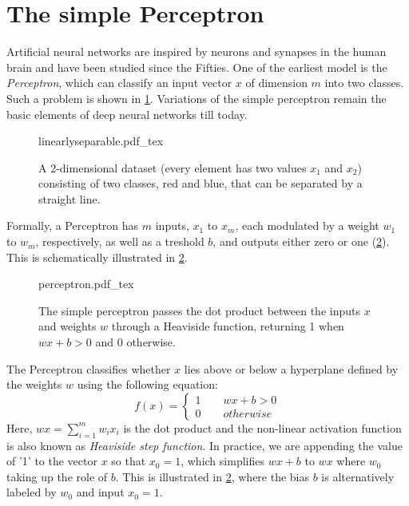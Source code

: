 \section{The simple Perceptron}
Artificial neural networks are inspired by neurons and synapses in the human brain and have been studied since the Fifties. One of the earliest model is the \textsl{Perceptron}, which can classify an input vector $x$ of dimension $m$ into two classes. Such a problem is shown in \cref{fig:linearsep}. Variations of the simple perceptron remain the basic elements of deep neural networks till today.

\begin{figure}[htb]
    \centering
    \def\svgwidth{0.6\textwidth}
    {linearlyseparable.pdf_tex}
    \caption{A 2-dimensional dataset (every element has two values $x_1$ and $x_2$) consisting of two classes, red and blue, that can be separated by a straight line.\label{fig:linearsep}}
\end{figure}

Formally, a Perceptron has $m$ inputs, $x_1$ to $x_m$, each modulated by a weight $w_1$ to $w_m$, respectively, as well as a treshold $b$, and outputs either zero or one (\cref{fig:perceptron}). This is schematically illustrated in \cref{fig:perceptron}.

\begin{figure}[htb]
    \centering
    \def\svgwidth{0.66\textwidth}
    {perceptron.pdf_tex}
    \caption{The simple perceptron passes the dot product between the inputs $x$ and weights $w$ through a Heaviside function, returning 1 when $wx+b>0$ and 0 otherwise.
    }\label{fig:perceptron}
\end{figure}

The Perceptron classifies whether $x$ lies above or below a hyperplane defined by the weights $w$ using the following equation:
%
\begin{equation}
f(x)=\begin{cases}
1 \qquad wx+b > 0\\
0 \qquad otherwise
\end{cases}
\end{equation}
%
Here, $wx=\sum_{i=1}^mw_ix_i$ is the dot product and the non-linear activation function is also known as \textsl{Heaviside step function}. In practice, we are appending the value of '1' to the vector $x$ so that $x_0=1$, which simplifies $wx+b$ to $wx$ where $w_0$ taking up the role of $b$. This is illustrated in \cref{fig:perceptron}, where the bias $b$ is alternatively labeled by $w_0$ and input $x_0=1$.


